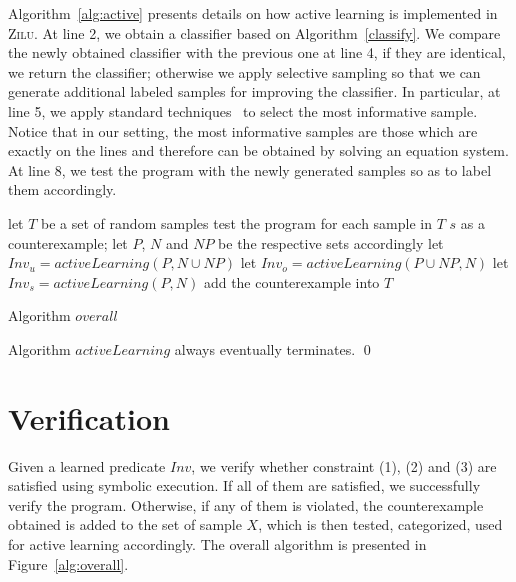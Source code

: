 Algorithm~\ref{alg:active} presents details on how active learning is implemented in \textsc{Zilu}. At line 2, we obtain a classifier based on Algorithm~\ref{classify}. We compare the newly obtained classifier with the previous one at line 4, if they are identical, we return the classifier; otherwise we apply selective sampling so that we can generate additional labeled samples for improving the classifier. In particular, at line 5, we apply standard techniques~\cite{DBLP:conf/icml/SchohnC00} to select the most informative sample. Notice that in our setting, the most informative samples are those which are exactly on the lines and therefore can be obtained by solving an equation system. At line 8, we test the program with the newly generated samples so as to label them accordingly.

\begin{algorithm}[t]
\SetAlgoVlined
\Indm
{}
\Indp
let $T$ be a set of random samples\;
 {
    test the program for each sample in $T$\;
     {
        \Return $s$ as a counterexample;
    }
    let $P$, $N$ and $NP$ be the respective sets accordingly\;
    let $Inv_u = activeLearning(P, N \cup NP)$\;
    let $Inv_o = activeLearning(P \cup NP, N)$\;
    let $Inv_s = activeLearning(P, N)$\;
     {
         {
            add the counterexample into $T$\;
        }
    }
}
\caption{Algorithm $overall$}
\label{alg:overall}
\end{algorithm}

\begin{example}
\end{example}

\begin{proposition}
Algorithm $activeLearning$ always eventually terminates. \hfill \qed
\end{proposition}

\section{Verification}
Given a learned predicate $Inv$, we verify whether constraint (1), (2) and (3) are satisfied using symbolic execution. If all of them are satisfied, we successfully verify the program. Otherwise, if any of them is violated, the counterexample obtained is added to the set of sample $X$, which is then tested, categorized, used for active learning accordingly. The overall algorithm is presented in Figure~\ref{alg:overall}.

